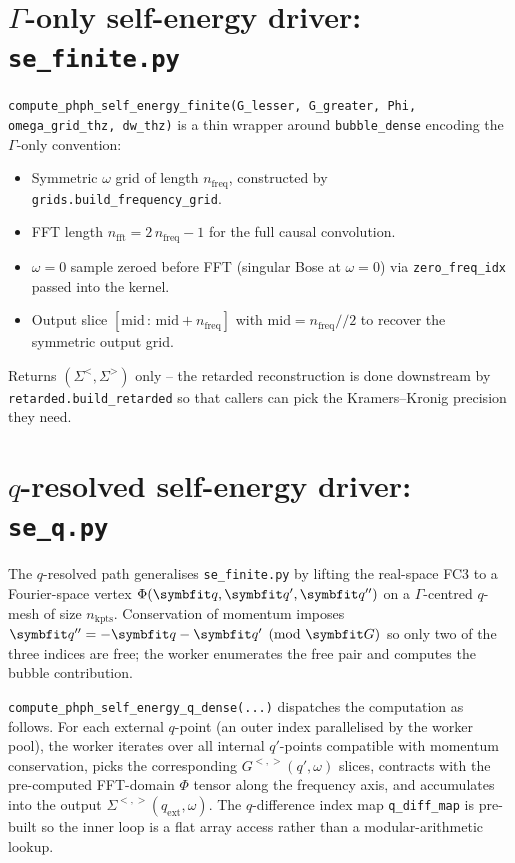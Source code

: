 \section[Gamma-only self-energy driver: \texttt{se\_finite.py}]{$\Gamma$-only self-energy driver: \texttt{se\_finite.py}}
\label{sec:se_finite}

\texttt{compute\_phph\_self\_energy\_finite(G\_lesser, G\_greater, Phi,
omega\_grid\_thz, dw\_thz)} is a thin wrapper around
\texttt{bubble\_dense} encoding the $\Gamma$-only convention:

\begin{itemize}
  \item Symmetric $\omega$ grid of length $n_\mathrm{freq}$,
        constructed by \texttt{grids.build\_frequency\_grid}.
  \item FFT length $n_\mathrm{fft} = 2\,n_\mathrm{freq} - 1$ for the
        full causal convolution.
  \item $\omega = 0$ sample zeroed before FFT (singular Bose at
        $\omega=0$) via \texttt{zero\_freq\_idx} passed into the
        kernel.
  \item Output slice $[\mathrm{mid}\,:\,\mathrm{mid}+n_\mathrm{freq}]$
        with $\mathrm{mid} = n_\mathrm{freq}//2$ to recover the symmetric
        output grid.
\end{itemize}

Returns $(\Sigma^<, \Sigma^>)$ only -- the retarded reconstruction is
done downstream by \texttt{retarded.build\_retarded} so that callers
can pick the Kramers--Kronig precision they need.

\section[q-resolved self-energy driver: \texttt{se\_q.py}]{$q$-resolved self-energy driver: \texttt{se\_q.py}}
\label{sec:se_q}

The $q$-resolved path generalises \texttt{se\_finite.py} by lifting the
real-space FC3 to a Fourier-space vertex
$\Phi(\vc{q}, \vc{q}', \vc{q}'')$ on a $\Gamma$-centred
$q$-mesh of size $n_\mathrm{kpts}$.  Conservation of momentum imposes
$\vc{q}'' = -\vc{q} - \vc{q}' \pmod{\vc{G}}$ so only two of the three
indices are free; the worker enumerates the free pair and computes
the bubble contribution.

\texttt{compute\_phph\_self\_energy\_q\_dense(...)} dispatches the
computation as follows.  For each external $q$-point (an outer index
parallelised by the worker pool), the worker iterates over all
internal $q'$-points compatible with momentum conservation, picks the
corresponding $G^{<,>}(q', \omega)$ slices, contracts with the
pre-computed FFT-domain $\Phi$ tensor along the frequency axis, and
accumulates into the output $\Sigma^{<,>}(q_\mathrm{ext}, \omega)$.  The
$q$-difference index map \texttt{q\_diff\_map} is pre-built so the
inner loop is a flat array access rather than a modular-arithmetic
lookup.


